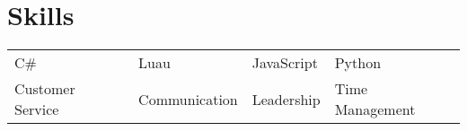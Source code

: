 \documentclass{my_cv}
\begin{document}
\section{Skills}
\begin{tabular}{l l l l}
    C\# & Luau & JavaScript & Python \\
    Customer Service & Communication & Leadership & Time Management
\end{tabular}
\end{document}

